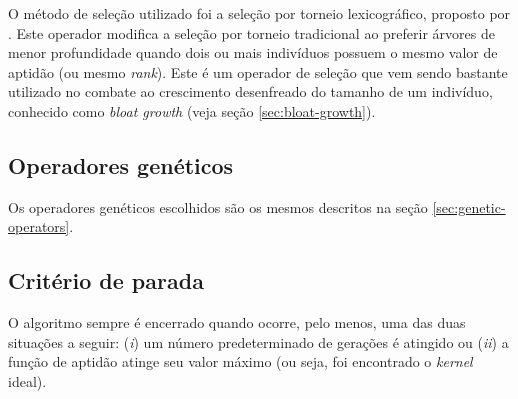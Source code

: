 O método de seleção utilizado foi a seleção por torneio lexicográfico, proposto por . Este operador modifica a seleção por torneio tradicional ao preferir árvores de menor profundidade quando dois ou mais indivíduos possuem o mesmo valor de aptidão (ou mesmo \textit{rank}). Este é um operador de seleção que vem sendo bastante utilizado no combate ao crescimento desenfreado do tamanho de um indivíduo, conhecido como \textit{bloat growth} (veja seção \ref{sec:bloat-growth}).

\subsection{Operadores genéticos}
Os operadores genéticos escolhidos são os mesmos descritos na seção \ref{sec:genetic-operators}.

\subsection{Critério de parada}
O algoritmo sempre é encerrado quando ocorre, pelo menos, uma das duas situações a seguir: (\textit{i}) um número predeterminado de gerações é atingido ou (\textit{ii}) a função de aptidão atinge seu valor máximo (ou seja, foi encontrado o \textit{kernel} ideal).
